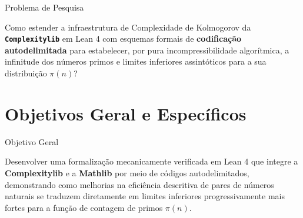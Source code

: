 \documentclass[10pt, aspectratio=43]{beamer}
\begin{document}
\begin{frame}{Problema de Pesquisa}

    \begin{tcolorbox}[pucbox, colframe=red!75!black, title=Problema Central de Pesquisa]
    Como estender a infraestrutura de Complexidade de Kolmogorov da \texttt{\textbf{Complexitylib}} em Lean 4 com esquemas formais de \textbf{codificação autodelimitada} para estabelecer, por pura incompressibilidade algorítmica, a infinitude dos números primos e limites inferiores assintóticos para a sua distribuição $\pi(n)$?
    \end{tcolorbox}
\end{frame}

\section{Objetivos Geral e Específicos}

\begin{frame}{Objetivo Geral}
    \begin{tcolorbox}[pucbox, title=Incompressibilidade Aplicada à Distribuição de Primos]
        {Desenvolver uma formalização mecanicamente verificada em Lean 4 que integre a \textbf{Complexitylib} e a \textbf{Mathlib} por meio de códigos autodelimitados, demonstrando como melhorias na eficiência descritiva de pares de números naturais se traduzem diretamente em limites inferiores progressivamente mais fortes para a função de contagem de primos $\pi(n)$.}
    \end{tcolorbox}
\end{frame}
\end{document}
